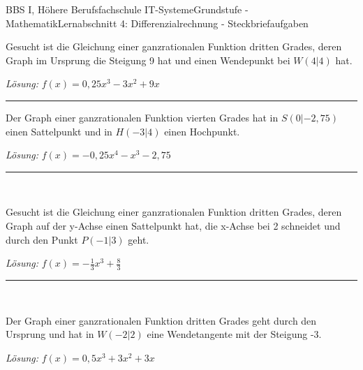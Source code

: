 \documentclass[oneside,openany,headings=optiontotoc,11pt,numbers=noenddot]{scrreprt}
\begin{document}
\begin{worksheet}{BBS I, Höhere Berufsfachschule IT-Systeme}{Grundstufe - Mathematik}{Lernabschnitt 4: Differenzialrechnung - Steckbriefaufgaben}
\begin{framed}
				Gesucht ist die Gleichung einer ganzrationalen Funktion dritten Grades, deren Graph im Ursprung die Steigung 9 hat und einen Wendepunkt bei \(W(4|4)\) hat.\\
				\par\noindent
				\footnotesize{\textit{Lösung:} \(f(x) = 0,25x^3 - 3x^2 + 9x\)}\\
				\normalsize
				\par\bigskip\noindent
				\rule{\textwidth}{0.1pt}
				\par\bigskip\noindent
				Der Graph einer ganzrationalen Funktion vierten Grades hat in \(S(0|-2,75)\) einen Sattelpunkt und in \(H(-3|4)\) einen Hochpunkt.\\
				\par\noindent
				\footnotesize{\textit{Lösung:} \(f(x) = -0,25x^4 - x^3 - 2,75\)}\\
				\normalsize
				\par\bigskip\noindent
				\rule{\textwidth}{0.1pt}\\
				\par\bigskip\noindent
				Gesucht ist die Gleichung einer ganzrationalen Funktion dritten Grades, deren Graph auf der y-Achse einen Sattelpunkt hat, die x-Achse bei 2 schneidet und durch den Punkt \(P(-1|3)\) geht.\\
				\par\noindent
				\footnotesize{\textit{Lösung:} \(f(x) = -\frac{1}{3}x^3 + \frac{8}{3}\)}\\
				\normalsize
				\par\bigskip\noindent
				\rule{\textwidth}{0.1pt}\\
				\par\bigskip\noindent
				Der Graph einer ganzrationalen Funktion dritten Grades geht durch den Ursprung und hat in \(W(-2|2)\) eine Wendetangente mit der Steigung -3.\\
				\par\noindent
				\footnotesize{\textit{Lösung:} \(f(x) = 0,5x^3 + 3x^2 + 3x\)}\\
				\normalsize
			\end{framed}
		\end{worksheet}
\end{document}
